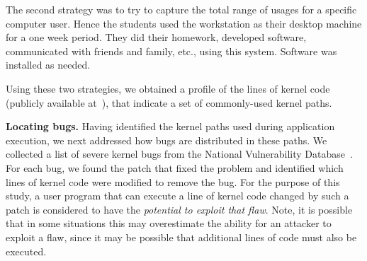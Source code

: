 The second strategy was to try to capture the total range of usages for a
specific computer user. Hence the students used the workstation as their
desktop machine for a one week period. They did their homework, developed
software, communicated with friends and family, etc., using this system. 
Software was installed as needed.

Using these two strategies, we obtained a profile of the lines of
kernel code (publicly available at~), that indicate
a set of commonly-used kernel paths.



\textbf{Locating bugs.}
Having identified the kernel paths used during application execution, we next 
addressed how bugs are distributed in these paths. We collected a list of
severe kernel bugs from the National Vulnerability Database~\cite{NVD}. 
For each bug, we
found the patch that fixed the problem and identified
which lines of kernel code were modified to remove the bug.
For the purpose of this study, a user program that can execute a line of kernel
code changed by such a patch is considered to have the \textit{potential to
exploit that flaw}.  Note, it is possible that in some situations this may
overestimate the ability for an attacker to exploit a flaw, since it may be
possible that additional lines of code must also be executed.


